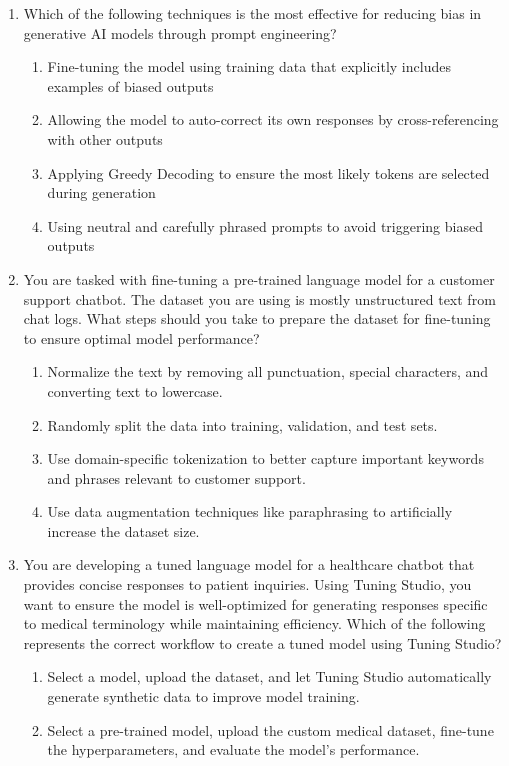 \begin{enumerate}[resume,leftmargin=*]
\begin{enumerate}[label=\Alph*.]
\end{enumerate}
\item Which of the following techniques is the most effective for reducing bias in generative AI models through prompt engineering?
\begin{enumerate}[label=\Alph*.]
  \item Fine-tuning the model using training data that explicitly includes examples of biased outputs
  \item Allowing the model to auto-correct its own responses by cross-referencing with other outputs
  \item Applying Greedy Decoding to ensure the most likely tokens are selected during generation
  \item Using neutral and carefully phrased prompts to avoid triggering biased outputs
\end{enumerate}
\item You are tasked with fine-tuning a pre-trained language model for a customer support chatbot. The dataset you are using is mostly unstructured text from chat logs. What steps should you take to prepare the dataset for fine-tuning to ensure optimal model performance?
\begin{enumerate}[label=\Alph*.]
  \item Normalize the text by removing all punctuation, special characters, and converting text to lowercase.
  \item Randomly split the data into training, validation, and test sets.
  \item Use domain-specific tokenization to better capture important keywords and phrases relevant to customer support.
  \item Use data augmentation techniques like paraphrasing to artificially increase the dataset size.
\end{enumerate}
\item You are developing a tuned language model for a healthcare chatbot that provides concise responses to patient inquiries. Using Tuning Studio, you want to ensure the model is well-optimized for generating responses specific to medical terminology while maintaining efficiency. Which of the following represents the correct workflow to create a tuned model using Tuning Studio?
\begin{enumerate}[label=\Alph*.]
  \item Select a model, upload the dataset, and let Tuning Studio automatically generate synthetic data to improve model training.
  \item Select a pre-trained model, upload the custom medical dataset, fine-tune the hyperparameters, and evaluate the model's performance.

\end{enumerate}
\end{enumerate}
